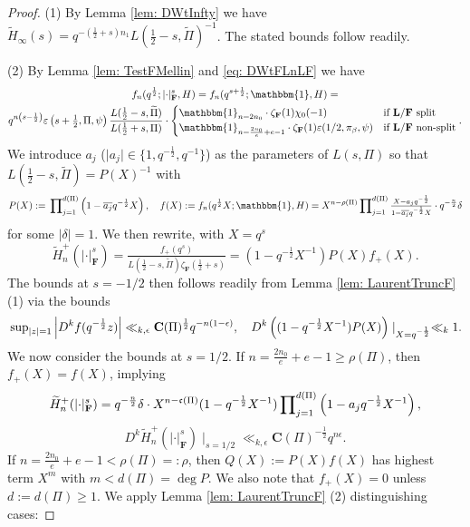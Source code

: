 \documentclass[A4]{amsart}
\def\geq{\geqslant}
\numberwithin{equation}{section} \everymath{\displaystyle}
\newcommand{\id}{\mathbbm{1}}
\newcommand{\F}{\mathbf{F}}
\newcommand{\bL}{\mathbf{L}}
\newcommand{\norm}[1][\cdot]{\lvert #1 \rvert}
\newcommand{\extnorm}[1]{\left\lvert #1 \right\rvert}
\newcommand{\Cond}{\mathbf{C}}
\newcommand{\cond}{\mathfrak{c}}
\newcommand{\condL}{\mathfrak{\rho}}
\begin{document}
\begin{proof}
	(1) By Lemma \ref{lem: DWtInfty} we have $\widetilde{H}_{\infty}(s) = q^{-\left( \frac{1}{2}+s \right) n_1} L\left( \tfrac{1}{2}-s, \widetilde{\Pi} \right)^{-1}$. The stated bounds follow readily.
	
\noindent (2) By Lemma \ref{lem: TestFMellin} and \eqref{eq: DWtFLnLF} we have
\begin{multline*}
	f_n(q^{\frac{1}{2}}; \norm_{\F}^s, H) = f_n(q^{s+\frac{1}{2}}; \id, H) = \\
	q^{n \left( s - \frac{1}{2} \right)} \varepsilon \left( s+\tfrac{1}{2}, \Pi, \psi \right) \frac{L(\tfrac{1}{2}-s, \widetilde{\Pi})}{L(\tfrac{1}{2}+s, \Pi)} \cdot \begin{cases}
		\id_{n=2n_0} \cdot \zeta_{\F}(1) \chi_0(-1) & \text{if } \bL/\F \text{ split} \\
		\id_{n=\frac{2n_0}{e}+e-1} \cdot \zeta_{\F}(1) \varepsilon(1/2, \pi_{\beta}, \psi) & \text{if } \bL/\F \text{ non-split}
	\end{cases}.
\end{multline*}
	We introduce $a_j$ ($\norm[a_j] \in \{ 1, q^{-\frac{1}{2}}, q^{-1} \}$) as the parameters of $L(s,\Pi)$ so that $L(\tfrac{1}{2}-s, \widetilde{\Pi})=P(X)^{-1}$ with
	$$ P(X) := \sideset{}{_{j=1}^{d(\Pi)}} \prod \left( 1 - \overline{a_j} q^{-\frac{1}{2}} X \right), \quad f(X) := f_n(q^{\frac{1}{2}} X; \id, H) = X^{n-\condL(\Pi)} \sideset{}{_{j=1}^{d(\Pi)}} \prod \tfrac{X - a_j q^{-\frac{1}{2}}}{1 - \overline{a_j} q^{-\frac{1}{2}} X} \cdot q^{-\frac{n}{2}} \delta $$
	for some $\norm[\delta]=1$. We then rewrite, with $X = q^s$
	$$ \widetilde{H}_n^+(\norm_{\F}^s) = \tfrac{f_+(q^s)}{L(\tfrac{1}{2}-s, \widetilde{\Pi}) \zeta_{\F}(\tfrac{1}{2}+s)} = (1-q^{-\frac{1}{2}}X^{-1}) P(X)f_+(X). $$
	The bounds at $s=-1/2$ then follows readily from Lemma \ref{lem: LaurentTruncF} (1) via the bounds
	$$ \sideset{}{_{\norm[z]=1}} \sup \extnorm{D^k f(q^{-\frac{1}{2}}z)} \ll_{k,\epsilon} \Cond(\Pi)^{\frac{1}{2}} q^{-n(1-\epsilon)}, \quad D^k \left( (1-q^{-\frac{1}{2}}X^{-1}) P(X) \right) \mid_{X=q^{-\frac{1}{2}}} \ll_k 1. $$
	We now consider the bounds at $s=1/2$. If $n=\tfrac{2n_0}{e}+e-1 \geq \condL(\Pi)$, then $f_+(X) = f(X)$, implying
	$$ \widetilde{H}_n^+(\norm_{\F}^s) = q^{-\frac{n}{2}} \delta \cdot X^{n-\cond(\Pi)} (1-q^{-\frac{1}{2}}X^{-1}) \sideset{}{_{j=1}^{d(\Pi)}} \prod \left( 1 - a_j q^{-\frac{1}{2}} X^{-1} \right), $$
	$$ D^k \widetilde{H}_n^+(\norm_{\F}^s) \mid_{s=1/2} \ll_{k,\epsilon} \Cond(\Pi)^{-\frac{1}{2}} q^{n\epsilon}. $$
	If $n=\tfrac{2n_0}{e}+e-1 < \condL(\Pi) =: \condL$, then $Q(X) := P(X) f(X)$ has highest term $X^m$ with $m < d(\Pi) = \deg P$. We also note that $f_+(X) = 0$ unless $d:=d(\Pi) \geq 1$. We apply Lemma \ref{lem: LaurentTruncF} (2) distinguishing cases:
	

\end{proof}
\end{document}
